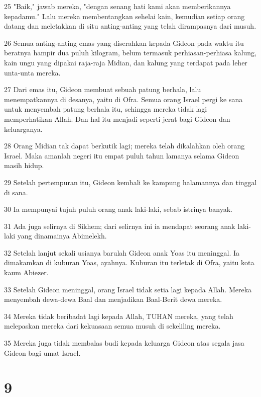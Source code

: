 \par 25 "Baik," jawab mereka, "dengan senang hati kami akan memberikannya kepadamu." Lalu mereka membentangkan sehelai kain, kemudian setiap orang datang dan meletakkan di situ anting-anting yang telah dirampasnya dari musuh.
\par 26 Semua anting-anting emas yang diserahkan kepada Gideon pada waktu itu beratnya hampir dua puluh kilogram, belum termasuk perhiasan-perhiasa kalung, kain ungu yang dipakai raja-raja Midian, dan kalung yang terdapat pada leher unta-unta mereka.
\par 27 Dari emas itu, Gideon membuat sebuah patung berhala, lalu menempatkannya di desanya, yaitu di Ofra. Semua orang Israel pergi ke sana untuk menyembah patung berhala itu, sehingga mereka tidak lagi memperhatikan Allah. Dan hal itu menjadi seperti jerat bagi Gideon dan keluarganya.
\par 28 Orang Midian tak dapat berkutik lagi; mereka telah dikalahkan oleh orang Israel. Maka amanlah negeri itu empat puluh tahun lamanya selama Gideon masih hidup.
\par 29 Setelah pertempuran itu, Gideon kembali ke kampung halamannya dan tinggal di sana.
\par 30 Ia mempunyai tujuh puluh orang anak laki-laki, sebab istrinya banyak.
\par 31 Ada juga selirnya di Sikhem; dari selirnya ini ia mendapat seorang anak laki-laki yang dinamainya Abimelekh.
\par 32 Setelah lanjut sekali usianya barulah Gideon anak Yoas itu meninggal. Ia dimakamkan di kuburan Yoas, ayahnya. Kuburan itu terletak di Ofra, yaitu kota kaum Abiezer.
\par 33 Setelah Gideon meninggal, orang Israel tidak setia lagi kepada Allah. Mereka menyembah dewa-dewa Baal dan menjadikan Baal-Berit dewa mereka.
\par 34 Mereka tidak beribadat lagi kepada Allah, TUHAN mereka, yang telah melepaskan mereka dari kekuasaan semua musuh di sekeliling mereka.
\par 35 Mereka juga tidak membalas budi kepada keluarga Gideon atas segala jasa Gideon bagi umat Israel.

\chapter{9}

